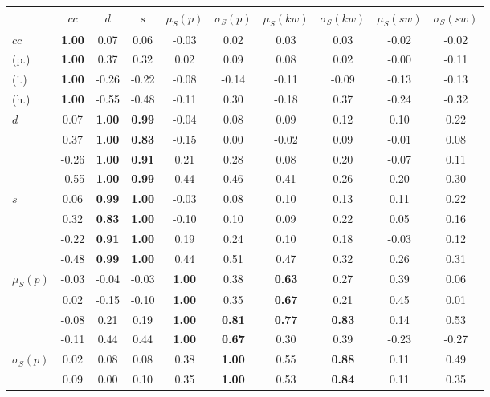 \begin{table*}[h!]
\begin{center}
\begin{tabular}{| l || c | c | c | c | c | c | c | c | c |}\hline
 & $cc$ & $d$ & $s$ & $\mu_S(p)$ & $\sigma_S(p)$ & $\mu_S(kw)$ & $\sigma_S(kw)$ & $\mu_S(sw)$ & $\sigma_S(sw)$ \\\hline\hline
$cc$ & {\bf 1.00} & 0.07 & 0.06 & -0.03 & 0.02 & 0.03 & 0.03 & -0.02 & -0.02 \\
(p.) & {\bf 1.00} & 0.37 & 0.32 & 0.02 & 0.09 & 0.08 & 0.02 & -0.00 & -0.11 \\
(i.) & {\bf 1.00} & -0.26 & -0.22 & -0.08 & -0.14 & -0.11 & -0.09 & -0.13 & -0.13 \\
(h.) & {\bf 1.00} & -0.55 & -0.48 & -0.11 & 0.30 & -0.18 & 0.37 & -0.24 & -0.32 \\\hline
$d$ & 0.07 & {\bf 1.00} & {\bf 0.99} & -0.04 & 0.08 & 0.09 & 0.12 & 0.10 & 0.22 \\
 & 0.37 & {\bf 1.00} & {\bf 0.83} & -0.15 & 0.00 & -0.02 & 0.09 & -0.01 & 0.08 \\
 & -0.26 & {\bf 1.00} & {\bf 0.91} & 0.21 & 0.28 & 0.08 & 0.20 & -0.07 & 0.11 \\
 & -0.55 & {\bf 1.00} & {\bf 0.99} & 0.44 & 0.46 & 0.41 & 0.26 & 0.20 & 0.30 \\\hline
$s$ & 0.06 & {\bf 0.99} & {\bf 1.00} & -0.03 & 0.08 & 0.10 & 0.13 & 0.11 & 0.22 \\
 & 0.32 & {\bf 0.83} & {\bf 1.00} & -0.10 & 0.10 & 0.09 & 0.22 & 0.05 & 0.16 \\
 & -0.22 & {\bf 0.91} & {\bf 1.00} & 0.19 & 0.24 & 0.10 & 0.18 & -0.03 & 0.12 \\
 & -0.48 & {\bf 0.99} & {\bf 1.00} & 0.44 & 0.51 & 0.47 & 0.32 & 0.26 & 0.31 \\\hline
$\mu_S(p)$ & -0.03 & -0.04 & -0.03 & {\bf 1.00} & 0.38 & {\bf 0.63} & 0.27 & 0.39 & 0.06 \\
 & 0.02 & -0.15 & -0.10 & {\bf 1.00} & 0.35 & {\bf 0.67} & 0.21 & 0.45 & 0.01 \\
 & -0.08 & 0.21 & 0.19 & {\bf 1.00} & {\bf 0.81} & {\bf 0.77} & {\bf 0.83} & 0.14 & 0.53 \\
 & -0.11 & 0.44 & 0.44 & {\bf 1.00} & {\bf 0.67} & 0.30 & 0.39 & -0.23 & -0.27 \\\hline
$\sigma_S(p)$ & 0.02 & 0.08 & 0.08 & 0.38 & {\bf 1.00} & 0.55 & {\bf 0.88} & 0.11 & 0.49 \\
 & 0.09 & 0.00 & 0.10 & 0.35 & {\bf 1.00} & 0.53 & {\bf 0.84} & 0.11 & 0.35 \\

\end{tabular}
\end{center}
\end{table*}
